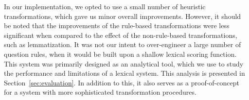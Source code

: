 In our implementation, we opted to use a small number of heuristic transformations, which gave us minor overall improvements. However, it should be noted that the improvements of the rule-based transformations were less significant when compared to the effect of the non-rule-based transformations, such as lemmatization. It was not our intent to over-engineer a large number of question rules, when it would be built upon a shallow lexical scoring function. This system was primarily designed as an analytical tool, which we use to study the performance and limitations of a lexical system. This analysis is presented in Section~\ref{sec:evaluation}. In addition to this, it also serves as a proof-of-concept for a system with more sophisticated transformation procedures. 
